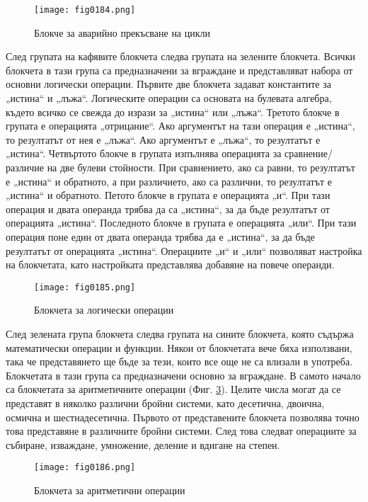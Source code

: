 \begin{figure}[H]
  \centering
  \texttt{[image: fig0184.png]}
  \caption{Блокче за аварийно прекъсване на цикли}
\label{fig0184}
\end{figure}

След групата на кафявите блокчета следва групата на зелените блокчета. Всички блокчета в тази група са предназначени за вграждане и представляват набора от основни логически операции. Първите две блокчета задават константите за „истина“ и „лъжа“. Логическите операции са основата на булевата алгебра, където всичко се свежда до изрази за „истина“ или „лъжа“. Третото блокче в групата е операцията „отрицание“. Ако аргументът на тази операция е „истина“, то резултатът от нея е „лъжа“. Ако аргументът е „лъжа“, то резултатът е „истина“. Четвъртото блокче в групата изпълнява операцията за сравнение/различие на две булеви стойности. При сравнението, ако са равни, то резултатът е „истина“ и обратното, а при различието, ако са различни, то резултатът е „истина“ и обратното. Петото блокче в групата е операцията „и“. При тази операция и двата операнда трябва да са „истина“, за да бъде резултатът от операцията „истина“. Последното блокче в групата е операцията „или“. При тази операция поне един от двата операнда трябва да е „истина“, за да бъде резултатът от операцията „истина“. Операциите „и“ и „или“ позволяват настройка на блокчетата, като настройката представлява добавяне на повече операнди. 

\begin{figure}[H]
  \centering
  \texttt{[image: fig0185.png]}
  \caption{Блокчета за логически операции}
\label{fig0185}
\end{figure}

След зелената група блокчета следва групата на сините блокчета, която съдържа математически операции и функции. Някои от блокчетата вече бяха използвани, така че представянето ще бъде за тези, които все още не са влизали в употреба. Блокчетата в тази група са предназначени основно за вграждане. В самото начало са блокчетата за аритметичните операции (Фиг. \ref{fig0186}). Целите числа могат да се представят в няколко различни бройни системи, като десетична, двоична, осмична и шестнадесетична. Първото от представените блокчета позволява точно това представяне в различните бройни системи. След това следват операциите за събиране, изваждане, умножение, деление и вдигане на степен. 

\begin{figure}[H]
  \centering
  \texttt{[image: fig0186.png]}
  \caption{Блокчета за аритметични операции}
\label{fig0186}
\end{figure}

